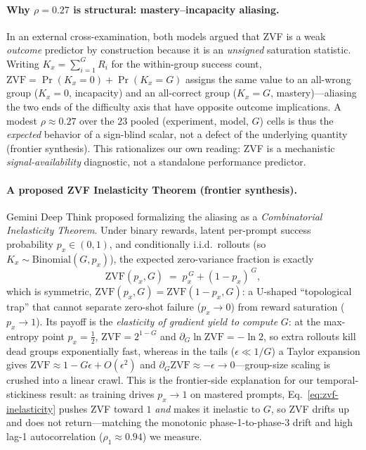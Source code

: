 \documentclass{article}
\begin{document}
\paragraph{Why $\rho = 0.27$ is structural: mastery--incapacity aliasing.}
In an external cross-examination, both models argued that ZVF is a weak
\emph{outcome} predictor by construction because it is an \emph{unsigned}
saturation statistic. Writing $K_x=\sum_{i=1}^{G} R_i$ for the within-group
success count, $\mathrm{ZVF}=\Pr(K_x=0)+\Pr(K_x=G)$ assigns the same value
to an all-wrong group ($K_x=0$, incapacity) and an all-correct group
($K_x=G$, mastery)---aliasing the two ends of the difficulty axis that
have opposite outcome implications. A modest $\rho\approx0.27$ over the
$23$ pooled (experiment, model, $G$) cells is thus the \emph{expected}
behavior of a sign-blind scalar, not a
defect of the underlying quantity (frontier synthesis). This rationalizes
our own reading: ZVF is a mechanistic \emph{signal-availability}
diagnostic, not a standalone performance predictor.

\paragraph{A proposed ZVF Inelasticity Theorem (frontier synthesis).}
Gemini Deep Think proposed formalizing the aliasing as a
\emph{Combinatorial Inelasticity Theorem}. Under binary rewards, latent
per-prompt success probability $p_x\in(0,1)$, and conditionally i.i.d.\
rollouts (so $K_x\sim\mathrm{Binomial}(G,p_x)$), the expected
zero-variance fraction is exactly
\begin{equation}
  \mathrm{ZVF}(p_x,G) \;=\; p_x^{\,G} + (1-p_x)^{\,G},
  \label{eq:zvf-inelasticity}
\end{equation}
which is symmetric, $\mathrm{ZVF}(p_x,G)=\mathrm{ZVF}(1-p_x,G)$: a
U-shaped ``topological trap'' that cannot separate zero-shot failure
($p_x\to0$) from reward saturation ($p_x\to1$). Its payoff is the
\emph{elasticity of gradient yield to compute} $G$: at the max-entropy
point $p_x=\tfrac12$, $\mathrm{ZVF}=2^{1-G}$ and
$\partial_G\ln\mathrm{ZVF}=-\ln 2$, so extra rollouts kill dead groups
exponentially fast, whereas in the tails ($\epsilon\ll 1/G$) a Taylor
expansion gives $\mathrm{ZVF}\approx 1-G\epsilon+O(\epsilon^2)$ and
$\partial_G\mathrm{ZVF}\approx-\epsilon\to 0$---group-size scaling is
crushed into a linear crawl. This is the frontier-side explanation for
our temporal-stickiness result: as training drives $p_x\to1$ on mastered
prompts, Eq.~\eqref{eq:zvf-inelasticity} pushes ZVF toward $1$
\emph{and} makes it inelastic to $G$, so ZVF drifts up and does not
return---matching the monotonic phase-1-to-phase-3 drift and high lag-1
autocorrelation ($\rho_1\approx0.94$) we measure.
\end{document}
